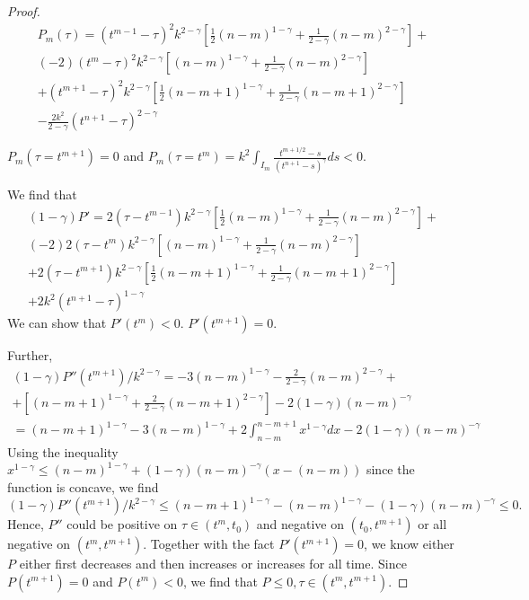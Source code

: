 \documentclass[11pt]{article}
\begin{document}
\begin{proof}
\begin{multline*}
P_m(\tau)=(t^{m-1}-\tau)^2k^{2-\gamma}[\frac{1}{2}(n-m)^{1-\gamma}+\frac{1}{2-\gamma}(n-m)^{2-\gamma}]+\\
(-2)(t^m-\tau)^2k^{2-\gamma}[(n-m)^{1-\gamma}+\frac{1}{2-\gamma}(n-m)^{2-\gamma}]\\
+(t^{m+1}-\tau)^2k^{2-\gamma}[\frac{1}{2}(n-m+1)^{1-\gamma}+\frac{1}{2-\gamma}(n-m+1)^{2-\gamma}]\\
-\frac{2k^2}{2-\gamma}(t^{n+1}-\tau)^{2-\gamma}
\end{multline*}

$P_m(\tau=t^{m+1})=0$ and
$P_m(\tau=t^m)=k^2\int_{I_m}\frac{t^{m+1/2}-s}{(t^{n+1}-s)^{\gamma}}ds<0$.

We find that 
\begin{multline*}
(1-\gamma)P'=2(\tau-t^{m-1})k^{2-\gamma}[\frac{1}{2}(n-m)^{1-\gamma}+\frac{1}{2-\gamma}(n-m)^{2-\gamma}]+\\
(-2)2(\tau-t^m)k^{2-\gamma}[(n-m)^{1-\gamma}+\frac{1}{2-\gamma}(n-m)^{2-\gamma}]\\
+2(\tau-t^{m+1})k^{2-\gamma}[\frac{1}{2}(n-m+1)^{1-\gamma}+\frac{1}{2-\gamma}(n-m+1)^{2-\gamma}]\\
+2k^2(t^{n+1}-\tau)^{1-\gamma}
\end{multline*}
We can show that $P'(t^m)<0$. $P'(t^{m+1})=0$. 

Further, 
\begin{multline*}
(1-\gamma)P''(t^{m+1})/k^{2-\gamma}=
-3(n-m)^{1-\gamma}-\frac{2}{2-\gamma}(n-m)^{2-\gamma}+\\
+[(n-m+1)^{1-\gamma}+\frac{2}{2-\gamma}(n-m+1)^{2-\gamma}]
-2(1-\gamma)(n-m)^{-\gamma}\\
=(n-m+1)^{1-\gamma}-3(n-m)^{1-\gamma}
+2\int_{n-m}^{n-m+1}x^{1-\gamma}dx-2(1-\gamma)(n-m)^{-\gamma}
\end{multline*}
Using the inequality $x^{1-\gamma}\le (n-m)^{1-\gamma}+(1-\gamma)(n-m)^{-\gamma}(x-(n-m))$ since the function is concave, we find $$
(1-\gamma)P''(t^{m+1})/k^{2-\gamma}\le (n-m+1)^{1-\gamma}-(n-m)^{1-\gamma}
-(1-\gamma)(n-m)^{-\gamma}\le 0.
$$
Hence, $P''$ could be positive on $\tau\in (t^m, t_0)$ and negative on $(t_0, t^{m+1})$ or all negative on $(t^m, t^{m+1})$. Together with the fact $P'(t^{m+1})=0$, we know either $P$ either first decreases and then increases or increases for all time. Since $P(t^{m+1})=0$ and $P(t^m)<0$, we find that $P\le 0,\tau\in (t^m, t^{m+1})$.
\end{proof}
\end{document}
